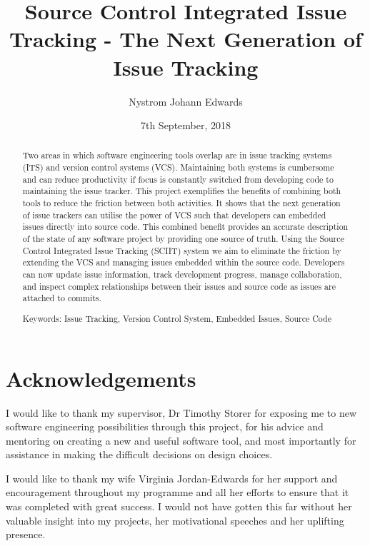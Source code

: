 \documentclass{mproj}
\begin{document}
\title{Source Control Integrated Issue Tracking - The Next Generation of Issue Tracking}
\author{Nystrom Johann Edwards}
\date{7th September, 2018}
\maketitle

\begin{abstract}
Two areas in which software engineering tools overlap are in issue tracking systems (ITS) and version control systems (VCS). Maintaining both systems is cumbersome and can reduce productivity if focus is constantly switched from developing code to maintaining the issue tracker. This project exemplifies the benefits of combining both tools to reduce the friction between both activities. It shows that the next generation of issue trackers can utilise the power of VCS such that developers can embedded issues directly into source code. This combined benefit provides an accurate description of the state of any software project by providing one source of truth. Using the Source Control Integrated Issue Tracking (SCIIT) system we aim to eliminate the friction by extending the VCS and managing issues embedded within the source code. Developers can now update issue information, track development progress, manage collaboration, and inspect complex relationships between their issues and source code as issues are attached to commits.  

Keywords: Issue Tracking, Version Control System, Embedded Issues, Source Code
\end{abstract}

\educationalconsent
\newpage

\section*{Acknowledgements}

I would like to thank my supervisor, Dr Timothy Storer for exposing me to new software engineering possibilities through this project, for his advice and mentoring on creating a new and useful software tool, and most importantly for assistance in making the difficult decisions on design choices.

I would like to thank my wife Virginia Jordan-Edwards for her support and encouragement throughout my programme and all her efforts to ensure that it was completed with great success. I would not have gotten this far without her valuable insight into my projects, her motivational speeches and her uplifting presence.
\end{document}
